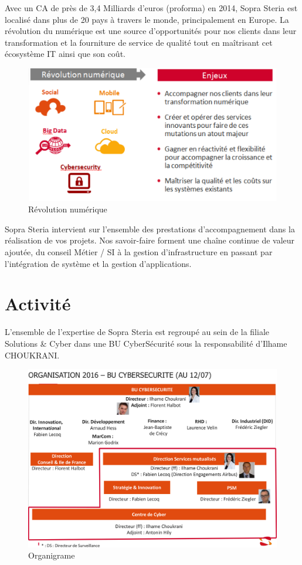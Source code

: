 \documentclass[a4paper]{memoir}
\begin{document}
Avec un CA de près de 3,4 Milliards d’euros (proforma) en 2014, Sopra Steria est localisé dans plus de 20
pays à travers le monde, principalement en Europe.
La révolution du numérique est une source d’opportunités pour nos clients dans leur transformation et la
fourniture de service de qualité tout en maîtrisant cet écosystème IT ainsi que son coût.

\begin{figure}[!ht]
    \center
    \includegraphics[width=1\textwidth]{./images/sopra3.png}
    \caption{Révolution numérique}
    \label{Révolution numérique}
\end{figure}

Sopra Steria intervient sur l’ensemble des prestations d’accompagnement dans la réalisation de vos projets.
Nos savoir-faire forment une chaîne continue de valeur ajoutée, du conseil Métier / SI à la gestion
d’infrastructure en passant par l’intégration de système et la gestion d’applications.

\newpage

\section*{Activité}

L’ensemble de l’expertise de Sopra Steria est regroupé au sein de la filiale Solutions \& Cyber dans une BU
CyberSécurité sous la responsabilité d’Ilhame CHOUKRANI.

\begin{figure}[!ht]
    \center
    \includegraphics[width=1\textwidth]{./images/sopra4.png}
    \caption{Organigrame}
    \label{Organigrame}
\end{figure}
\end{document}
